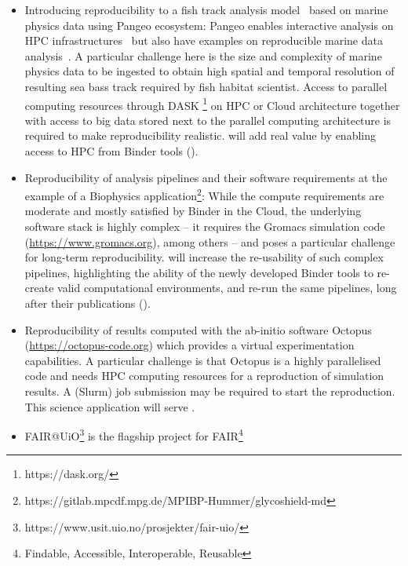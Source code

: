 \begin{itemize}
\item Introducing reproducibility to a fish track analysis model~\cite{woillez2016} based on
  marine physics data using Pangeo ecosystem:
  Pangeo enables interactive analysis on HPC infrastructures~\cite{odaka2020}
  but also have examples on reproducible marine data analysis~\cite{maze2020}.
  A particular challenge here is
  the size and complexity of marine physics data to be ingested
  to obtain high spatial and temporal resolution of resulting sea bass track
  required by fish habitat scientist.
  Access to parallel computing resources through DASK \footnote{https://dask.org/} on HPC or
  Cloud architecture together with access to big data stored next to the
  parallel computing architecture is required to make reproducibility realistic. 
  \TheProject will add real value by enabling access to HPC from Binder tools ().
\item Reproducibility of analysis pipelines and their software
  requirements at the example of a
  Biophysics application\footnote{https://gitlab.mpcdf.mpg.de/MPIBP-Hummer/glycoshield-md}:
  While the compute requirements are moderate and mostly satisfied by Binder in the Cloud,
  the underlying software stack is highly complex -- it requires the Gromacs simulation
  code (\href{https://www.gromacs.org}{https://www.gromacs.org}), among others
  -- and poses a particular challenge for long-term reproducibility.
  \TheProject will increase the re-usability of such complex pipelines, 
  highlighting the ability of the newly developed Binder tools to re-create valid computational environments,
  and re-run the same pipelines, long after their publications (). 
\item Reproducibility of results computed with the ab-initio software Octopus
  (\href{https://octopus-code.org}{https://octopus-code.org}) which provides a
  virtual experimentation capabilities. A particular challenge is that Octopus
  is a highly parallelised code and needs HPC computing resources for a
  reproduction of simulation results. A (Slurm) job submission may be required
  to start the reproduction. This science application will serve .
\item FAIR@UiO\footnote{https://www.usit.uio.no/prosjekter/fair-uio/} is the flagship project for FAIR\footnote{Findable, Accessible, Interoperable, Reusable} 

\end{itemize}
